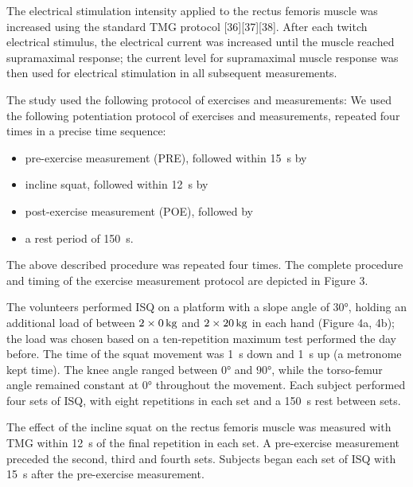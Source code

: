 \documentclass[utf8]{style/FrontiersinHarvard}
\begin{document}
The electrical stimulation intensity applied to the rectus femoris muscle was increased using the standard TMG protocol [36][37][38].
After each twitch electrical stimulus, the electrical current was increased until the muscle reached supramaximal response;
the current level for supramaximal muscle response was then used for electrical stimulation in all subsequent measurements.

The study used the following protocol of exercises and measurements:
We used the following potentiation protocol of exercises and measurements, repeated four times in a precise time sequence:
\begin{itemize}

    \item pre-exercise measurement (PRE), followed within \SI{15}{\second} by

    \item incline squat, followed within \SI{12}{\second} by

    \item post-exercise measurement (POE), followed by

    \item a rest period of \SI{150}{\second}.

\end{itemize}
The above described procedure was repeated four times.
The complete procedure and timing of the exercise measurement protocol are depicted in Figure 3.

The volunteers performed ISQ on a platform with a slope angle of $ \ang{30} $, holding an additional load of between $ \SI[parse-numbers = false]{2 \times 0}{\kilogram} $ and $ \SI[parse-numbers = false]{2 \times 20}{\kilogram} $ in each hand (Figure 4a, 4b);
the load was chosen based on a ten-repetition maximum test performed the day before.
The time of the squat movement was \SI{1}{\second} down and \SI{1}{\second} up (a metronome kept time).
The knee angle ranged between $ \ang{0} $ and $ \ang{90} $, while the torso-femur angle remained constant at $ \ang{0} $ throughout the movement.
Each subject performed four sets of ISQ, with eight repetitions in each set and a \SI{150}{\second} rest between sets.

The effect of the incline squat on the rectus femoris muscle was measured with TMG within \SI{12}{\second} of the final repetition in each set.
A pre-exercise measurement preceded the second, third and fourth sets.
Subjects began each set of ISQ with \SI{15}{\second} after the pre-exercise measurement.
\end{document}
